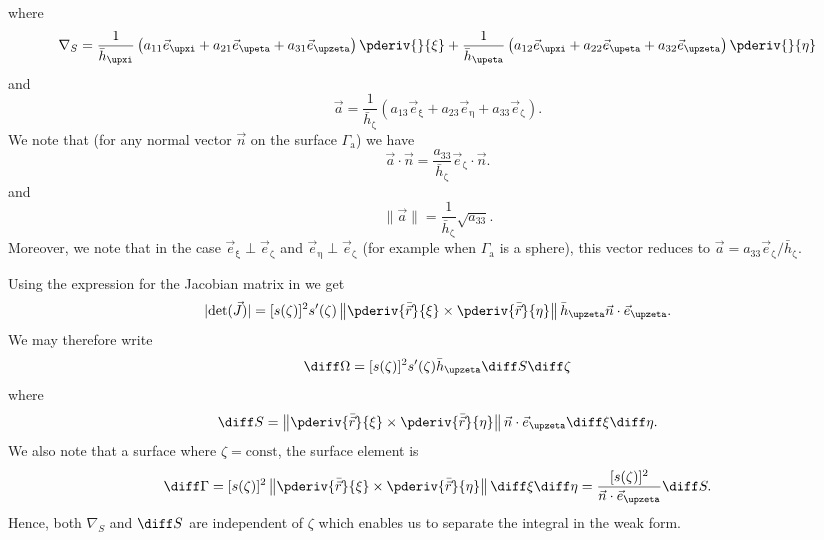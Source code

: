 where
\begin{equation*}
	\nabla_S = \frac{1}{\bar{h}_{\upxi}}\left(a_{11}\vec{e}_{\upxi} + a_{21} \vec{e}_{\upeta} + a_{31}\vec{e}_{\upzeta}\right)\pderiv{}{\xi}+\frac{1}{\bar{h}_{\upeta}}\left(a_{12}\vec{e}_{\upxi} + a_{22} \vec{e}_{\upeta} + a_{32}\vec{e}_{\upzeta}\right)\pderiv{}{\eta}
\end{equation*}
and
\begin{equation*}
	\vec{a} = \frac{1}{\bar{h}_{\upzeta}}\left(a_{13}\vec{e}_{\upxi} + a_{23} \vec{e}_{\upeta} + a_{33}\vec{e}_{\upzeta}\right).
\end{equation*}
We note that (for any normal vector $\vec{n}$ on the surface $\Gamma_{\mathrm{a}}$) we have
\begin{equation}\label{Eq2:anRel}
	\vec{a}\cdot\vec{n} = \frac{a_{33}}{\bar{h}_{\upzeta}}\vec{e}_{\upzeta}\cdot\vec{n}.
\end{equation}
and
\begin{equation*}
	\| \vec{a} \| = \frac{1}{\bar{h}_{\upzeta}}\sqrt{a_{33}}.
\end{equation*}
Moreover, we note that in the case $\vec{e}_{\upxi} \perp \vec{e}_{\upzeta}$ and $\vec{e}_{\upeta} \perp \vec{e}_{\upzeta}$ (for example when $\Gamma_{\mathrm{a}}$ is a sphere), this vector reduces to $\vec{a}=a_{33}\vec{e}_{\upzeta}/\bar{h}_{\upzeta}$.

Using the expression for the Jacobian matrix in  we get
\begin{equation*}
	|\mathrm{det}(\vec{J})| = [s(\zeta)]^2s'(\zeta)\left\|\pderiv{\bar{\vec{r}}}{\xi}\times\pderiv{\bar{\vec{r}}}{\eta} \right\|\bar{h}_{\upzeta} \vec{n}\cdot \vec{e}_{\upzeta}.
\end{equation*}
We may therefore write
\begin{equation*}
	\diff\Omega = [s(\zeta)]^2s'(\zeta)\bar{h}_{\upzeta}\diff S\diff\zeta
\end{equation*}
where
\begin{equation*}
	\diff S = \left\|\pderiv{\bar{\vec{r}}}{\xi}\times\pderiv{\bar{\vec{r}}}{\eta} \right\|\vec{n}\cdot \vec{e}_{\upzeta}\diff\xi\diff\eta.
\end{equation*}
We also note that a surface where $\zeta=\textrm{const}$, the surface element is 
\begin{equation*}
	 \diff\Gamma = [s(\zeta)]^2 \left\|\pderiv{\bar{\vec{r}}}{\xi}\times\pderiv{\bar{\vec{r}}}{\eta} \right\| \diff\xi\diff\eta = \frac{[s(\zeta)]^2}{\vec{n}\cdot\vec{e}_{\upzeta}}\diff S.
\end{equation*}
Hence, both $\nabla_S$ and $\diff S$ are independent of $\zeta$ which enables us to separate the integral in the weak form. 

